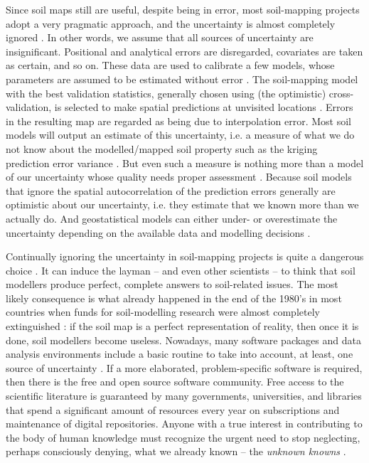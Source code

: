 Since soil maps still are useful, despite being in error, most soil-mapping projects adopt a very
pragmatic approach, and the uncertainty is almost completely ignored \cite{McBratneyEtAl2003,ScullEtAl2003}.
In other words, we assume that all sources of uncertainty are insignificant.
Positional and analytical errors are disregarded, covariates are taken as certain, and so on. These
data are used to calibrate a few models, whose parameters are assumed to be estimated without error
\cite{DiggleEtAl1998}. The soil-mapping model with the best validation statistics, generally
chosen using (the optimistic) cross-validation, is selected to make spatial predictions at unvisited
locations \cite{BrusEtAl2011}. Errors in the resulting map are regarded as being due to interpolation
error. Most soil models will output an estimate of this uncertainty, i.e. a measure of what
we do not know about the modelled/mapped soil property such as the kriging prediction error variance
\cite{HeuvelinkEtAl1989}. But even such a measure is nothing more than a model of our uncertainty
whose quality needs proper assessment \cite{Goovaerts2001}. Because soil models that ignore
the spatial autocorrelation of the prediction errors generally are optimistic about our uncertainty,
i.e. they estimate that we known more than we actually do. And geostatistical models can either
under- or overestimate the uncertainty depending on the available data and modelling decisions
\cite{Lark2000a}.

Continually ignoring the uncertainty in soil-mapping projects is quite a dangerous choice
\cite{HeuvelinkEtAl1999}. It can induce the layman -- and even other scientists -- to think that
soil modellers produce perfect, complete answers to soil-related issues. The most likely
consequence is what already happened in the end of the 1980's in most countries when funds for
soil-modelling research were almost completely extinguished
\cite{Basher1997, Dalmolin1999, Ker1999, Ramos2003, HarteminkEtAl2008, Finke2012}: if the soil map is a perfect
representation of reality, then once it is done, soil modellers become useless. Nowadays, many
software packages and data analysis environments include a basic routine to take into account, at
least, one source of uncertainty \cite{ChristensenEtAl2002, Papritz2015, RibeiroJrEtAl2015}. If a
more elaborated, problem-specific software is required, then there is the free and open source
software community. Free access to the scientific literature is guaranteed by many governments,
universities, and libraries that spend a significant amount of resources every year on subscriptions
and maintenance of digital repositories. Anyone with a true interest in contributing to the body of
human knowledge must recognize the urgent need to stop neglecting, perhaps consciously denying, what
we already known -- the \emph{unknown knowns} \cite{Zizek2006}.

